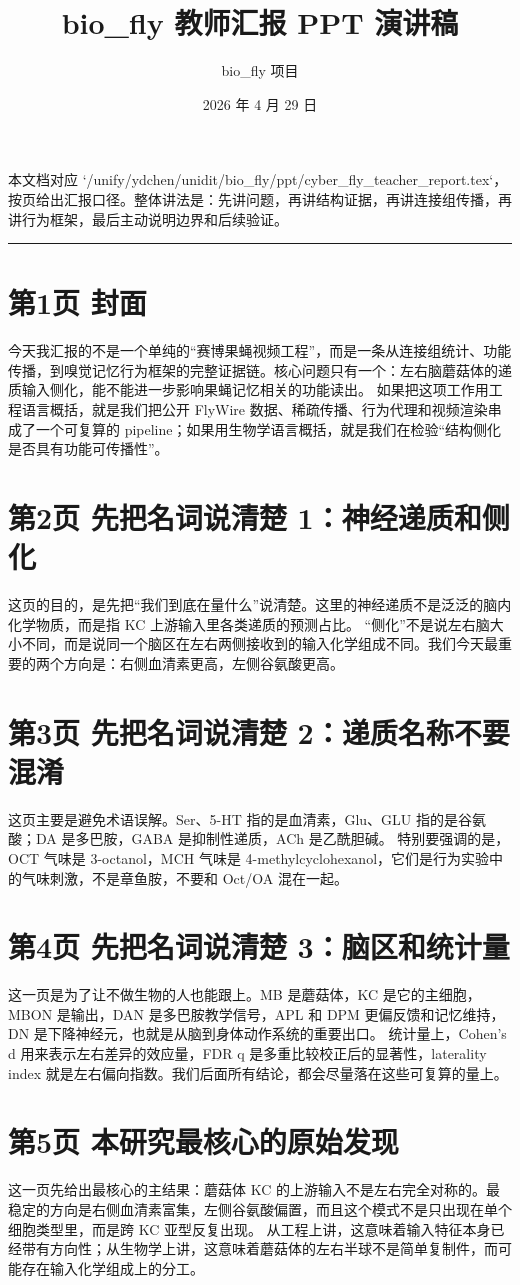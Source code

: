 \documentclass[11pt,fontset=none]{ctexart}
\title{bio\_fly 教师汇报 PPT 演讲稿}
\author{bio\_fly 项目}
\date{2026 年 4 月 29 日}
\begin{document}
\maketitle
本文档对应 `/unify/ydchen/unidit/bio\_fly/ppt/cyber\_fly\_teacher\_report.tex`，按页给出汇报口径。整体讲法是：先讲问题，再讲结构证据，再讲连接组传播，再讲行为框架，最后主动说明边界和后续验证。
\bigskip\hrule\bigskip
\section*{第1页 封面}
今天我汇报的不是一个单纯的“赛博果蝇视频工程”，而是一条从连接组统计、功能传播，到嗅觉记忆行为框架的完整证据链。核心问题只有一个：左右脑蘑菇体的递质输入侧化，能不能进一步影响果蝇记忆相关的功能读出。
如果把这项工作用工程语言概括，就是我们把公开 FlyWire 数据、稀疏传播、行为代理和视频渲染串成了一个可复算的 pipeline；如果用生物学语言概括，就是我们在检验“结构侧化是否具有功能可传播性”。
\section*{第2页 先把名词说清楚 1：神经递质和侧化}
这页的目的，是先把“我们到底在量什么”说清楚。这里的神经递质不是泛泛的脑内化学物质，而是指 KC 上游输入里各类递质的预测占比。
“侧化”不是说左右脑大小不同，而是说同一个脑区在左右两侧接收到的输入化学组成不同。我们今天最重要的两个方向是：右侧血清素更高，左侧谷氨酸更高。
\section*{第3页 先把名词说清楚 2：递质名称不要混淆}
这页主要是避免术语误解。Ser、5-HT 指的是血清素，Glu、GLU 指的是谷氨酸；DA 是多巴胺，GABA 是抑制性递质，ACh 是乙酰胆碱。
特别要强调的是，OCT 气味是 3-octanol，MCH 气味是 4-methylcyclohexanol，它们是行为实验中的气味刺激，不是章鱼胺，不要和 Oct/OA 混在一起。
\section*{第4页 先把名词说清楚 3：脑区和统计量}
这一页是为了让不做生物的人也能跟上。MB 是蘑菇体，KC 是它的主细胞，MBON 是输出，DAN 是多巴胺教学信号，APL 和 DPM 更偏反馈和记忆维持，DN 是下降神经元，也就是从脑到身体动作系统的重要出口。
统计量上，Cohen's d 用来表示左右差异的效应量，FDR q 是多重比较校正后的显著性，laterality index 就是左右偏向指数。我们后面所有结论，都会尽量落在这些可复算的量上。
\section*{第5页 本研究最核心的原始发现}
这一页先给出最核心的主结果：蘑菇体 KC 的上游输入不是左右完全对称的。最稳定的方向是右侧血清素富集，左侧谷氨酸偏置，而且这个模式不是只出现在单个细胞类型里，而是跨 KC 亚型反复出现。
从工程上讲，这意味着输入特征本身已经带有方向性；从生物学上讲，这意味着蘑菇体的左右半球不是简单复制件，而可能存在输入化学组成上的分工。
\end{document}
